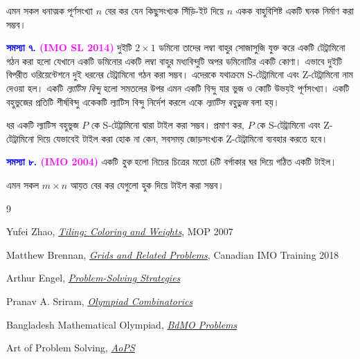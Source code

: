 \documentclass[11pt]{report}
\begin{document}
\begin{flushleft}
এমন সকল ধনাত্মক পূর্ণসংখ্যা $n$ বের কর যেন কিছুসংখ্যক সিঁড়ি-ইট দিয়ে $n$ একক বাহুবিশিষ্ট একটি ঘনক নির্মাণ করা সম্ভব।

\textbf{\textcolor{blue}{সমস্যা ৭.} \textcolor{magenta}{(IMO SL 2014)}}
দুইটি $2 \times 1$ ডমিনো তাদের লম্বা বাহুর সোজাসুজি যুক্ত করে একটি টেট্রামিনো গঠন করা হলো যেখানে একটি ডমিনোর একটি লম্বা বাহুর মধ্যবিন্দুটি অপর ডমিনোটির একটি কোণা। এভাবে দুইটি বিপরীত ওরিয়েন্টেশনে দুই ধরনের টেট্রামিনো গঠন করা সম্ভব। এদেরকে যথাক্রমে S-টেট্রামিনো এবং Z-টেট্রামিনো নাম দেওয়া হল। একটি \textit{ল্যাটিস বিন্দু} হলো সমতলের উপর এমন একটি বিন্দু যার ভুজ ও কোটি উভয়ই পূর্ণসংখ্যা। একটি বহুভুজের প্রতিটি শীর্ষবিন্দু একেকটি ল্যাটিস বিন্দু নির্দেশ করলে একে \textit{ল্যাটিস বহুভুজ} বলা হয়।

ধর একটি ল্যাটিস বহুভুজ $P$ কে S-টেট্রামিনো দ্বারা টাইল করা সম্ভব। প্রমাণ কর, $P$ কে S-টেট্রামিনো এবং Z-টেট্রামিনো দিয়ে যেভাবেই টাইল করা হোক না কেন, সবসময় জোড়সংখ্যক Z-টেট্রামিনো ব্যবহার করতে হবে।

\textbf{\textcolor{blue}{সমস্যা ৮.} \textcolor{magenta}{(IMO 2004)}}
একটি \textit{হুক} হলো নিচের চিত্রের মতো $6$টি বর্গাকার ঘর দিয়ে গঠিত একটি টাইল।

\begin{center}
\end{center}

এমন সকল $m \times n$ আয়ত বের কর যেগুলো হুক দিয়ে টাইল করা সম্ভব।

\end{flushleft}

\begin{thebibliography}{9}

Yufei Zhao, \emph{\href{https://yufeizhao.com/olympiad/tiling.pdf}{Tiling: Coloring and Weights}}, MOP 2007

Matthew Brennan, \emph{\href{https://drive.google.com/file/d/1LKE1mfXuJ4U_5Ykbu5yErWba66G-7-BB/view}{Grids and Related Problems}}, Canadian IMO Training 2018

Arthur Engel, \emph{\href{https://mathematicalolympiads.files.wordpress.com/2012/08/75427434-problem-books-in-mathematics-problem-solving-strategies.pdf}{Problem-Solving Strategies}}

Pranav A. Sriram, \emph{\href{https://cdn.bc-pf.org/resources/math/combinatorics/Pranav_Sriram-Olympiad_Combinatorics.pdf}{Olympiad Combinatorics}}

Bangladesh Mathematical Olympiad, \emph{\href{https://matholympiad.org.bd/questions}{BdMO Problems}}

Art of Problem Solving, \emph{\href{https://artofproblemsolving.com/}{AoPS}}

\end{thebibliography}
\end{document}
